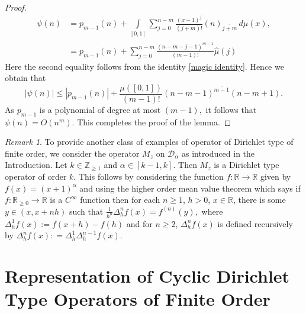 \documentclass[10pt,oneside,reqno]{amsart}
\theoremstyle{definition}
\theoremstyle{remark}
\newtheorem{remark}[theorem]{Remark}
\newcommand{\abs}[1]{\left\lvert #1 \right\rvert}
\renewcommand{\le}{\leqslant}
\renewcommand{\ge}{\geqslant}
\newcommand{\R}{\mathbb R}
\numberwithin{equation}{section}
\begin{document}
\begin{proof}
    \begin{align*}
        \psi(n) &= p_{m-1}(n) + \int\limits_{[0,1]} \sum_{j=0}^{n-m} \frac{(x - 1)^j}{(j + m)!}  (n)_{\overline{j+m}} \, d\mu(x),\\
        &= p_{m-1} \left( n \right) +  \sum_{j=0}^{n-m} \frac{\left( n-m-j-1 \right)^{ \overline{m-1} }}{\left( m-1 \right)!} \hat{\mu} \left( j \right)
    \end{align*}
Here the second equality follows from the identity \eqref{magic identity}. Hence we obtain that 
\begin{equation*}
	\abs{\psi \left( n \right)} \le |p_{m-1} \left( n \right)|+ \frac{\mu \left( [0,1] \right)}{(m-1)!} \left( n-m-1 \right)^{ \overline{m-1}} \left( n-m+1 \right). 
    \end{equation*}
As $p_{m-1}$ is a polynomial of degree at most $(m-1),$ it follows that $\psi(n)=O(n^m).$ This completes the proof of the lemma.
\end{proof}

\begin{remark}\label{another example}
    To provide another class of examples of operator of Dirichlet type of finite order, we consider the operator $M_z$ on $\mathscr D_{\alpha}$ as introduced in the Introduction. Let $k\in\mathbb Z_{\geqslant 1}$ and $\alpha \in [k-1, k].$ Then $M_z$ is a Dirichlet type operator of order $k.$ This follows by considering the function $f: \R \to \R$ given by $f(x)= (x+1)^{\alpha}$ and using the higher order mean value theorem which says if $f : \R_{\geqslant 0} \to \R$ is a $C^{\infty}$ function then for each $n \ge 1$, $h > 0$, $x \in \R$, there is some $y \in \left( x, x+nh \right)$ such that 
	    $\frac{1}{h^{n}} \Delta ^{n} _{h} f \left( x \right) = f^{\left( n \right)} \left( y \right),$ where $\Delta ^1 _{h} f (x) := f(x+h) - f(h)$ and for $n \ge 2$, $\Delta ^n _h f(x)$ is defined recursively by $\Delta ^n _h f(x): =\Delta ^1 _h \Delta ^{n-1} _ h f(x)$.
\end{remark}

\section{Representation of Cyclic Dirichlet Type Operators of Finite Order}
\end{document}
